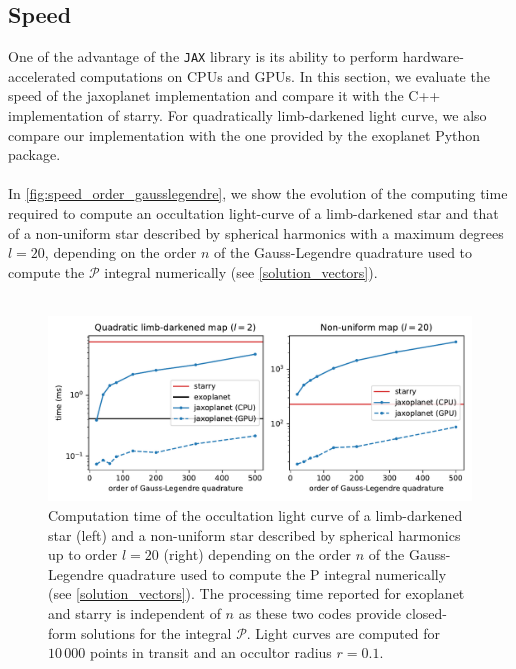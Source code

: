 \documentclass[modern]{aastex631}
\begin{document}
\subsection{Speed}\label{speed}

One of the advantage of the \texttt{JAX} library is its ability to perform hardware-accelerated computations on CPUs and GPUs. In this section, we evaluate the speed of the \textsf{jaxoplanet} implementation and compare it with the C++ implementation of \textsf{starry}. For quadratically limb-darkened light curve, we also compare our implementation with the one provided by the \textsf{exoplanet} Python package.\\\\
In \autoref{fig:speed_order_gausslegendre}, we show the evolution of the computing time required to compute an occultation light-curve of a limb-darkened star and that of a non-uniform star described by spherical harmonics with a maximum degrees $l=20$, depending on the order $n$ of the Gauss-Legendre quadrature used to compute the $\mathcal{P}$ integral numerically (see \autoref{solution_vectors}).\\\\
\begin{figure}[H]
    \begin{center}
        \includegraphics[width=\textwidth]{../workflows/speed/figures/speed_vs_order.pdf}
        \caption{Computation time of the occultation light curve of a limb-darkened star (left) and a non-uniform star described by spherical harmonics up to order $l=20$ (right) depending on the order $n$ of the Gauss-Legendre quadrature used to compute the P integral numerically (see \autoref{solution_vectors}). The processing time reported for \textsf{exoplanet} and \textsf{starry} is independent of $n$ as these two codes provide closed-form solutions for the integral $\mathcal{P}$. Light curves are computed for $10\,000$ points in transit and an occultor radius $r=0.1$.}
        \label{fig:speed_order_gausslegendre}
    \end{center}
\end{figure}
\end{document}

